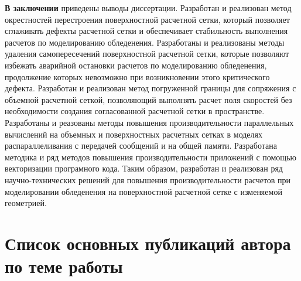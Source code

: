 \documentclass[a4paper,14pt]{extarticle}                     %
\theoremstyle{plain}                                         %
\begin{document}

\textbf{В заключении} приведены выводы диссертации.
Разработан и реализован метод окрестностей перестроения поверхностной расчетной сетки, который позволяет сглаживать дефекты расчетной сетки и обеспечивает стабильность выполнения расчетов по моделированию обледенения.
Разработаны и реализованы методы удаления самопересечений поверхностной расчетной сетки, которые позволяют избежать аварийной остановки расчетов по моделированию обледенения, продолжение которых невозможно при возникновении этого критического дефекта.
Разработан и реализован метод погруженной границы для сопряжения с объемной расчетной сеткой, позволяющий выполнять расчет поля скоростей без необходимости создания согласованной расчетной сетки в пространстве.
Разработаны и реазованы методы повышения производительности параллельных вычислений на объемных и поверхностных расчетных сетках в моделях распараллеливания с передачей сообщений и на общей памяти.
Разработана методика и ряд методов повышения производительности приложений с помощью векторизации програмного кода.
Таким образом, разработан и реализован ряд научно-технических решений для повышения производительности расчетов при моделировании обледенения на поверхностной расчетной сетке с изменяемой геометрией.

\newpage
\section*{Список основных публикаций автора по теме работы}
\end{document}
